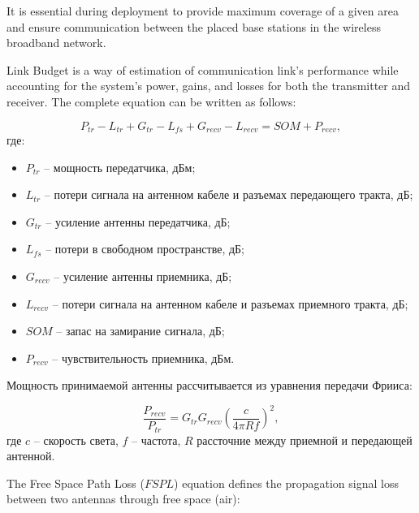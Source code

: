 It is essential during deployment to provide maximum coverage of a given area and ensure communication between the placed base stations in the wireless broadband network. 

Link Budget is a way of estimation of communication link's performance while accounting for the system's power, gains, and losses for both the transmitter and receiver. The complete equation can be written as follows:

\begin{equation}
  \label{eq:part3_link_budget}
  P_{tr} - L_{tr} + G_{tr} - L_{fs} + G_{recv} - L_{recv} = SOM + P_{recv},
\end{equation}
где:

\begin{itemize}

  \item $P_{tr}$ -- мощность передатчика, дБм;

  \item $L_{tr}$ -- потери сигнала на антенном кабеле и разъемах передающего тракта, дБ;

  \item $G_{tr}$ -- усиление антенны передатчика, дБ;

  \item $L_{fs}$ -- потери в свободном пространстве, дБ;

  \item $G_{recv}$ -- усиление антенны приемника, дБ;

  \item $L_{recv}$ -- потери сигнала на антенном кабеле и разъемах приемного тракта, дБ;

  \item $SOM$ -- запас на замирание сигнала, дБ;

  \item $P_{recv}$ -- чувствительность приемника, дБм.

\end{itemize}

Мощность принимаемой антенны рассчитывается из уравнения передачи Фрииса:

\begin{displaymath}
  \label{eq:part3_Friis}
  \frac{P_{recv}}{P_{tr}} = G_{tr}G_{recv}\left(\frac{c}{4\pi R f} \right)^2,
\end{displaymath}
где
$c$ --  скорость света,
$f$ -- частота, 
$R$ рассточние между приемной и передающей антенной.

The Free Space Path Loss ($ FSPL $) equation defines the propagation signal loss between two antennas through free space (air):

